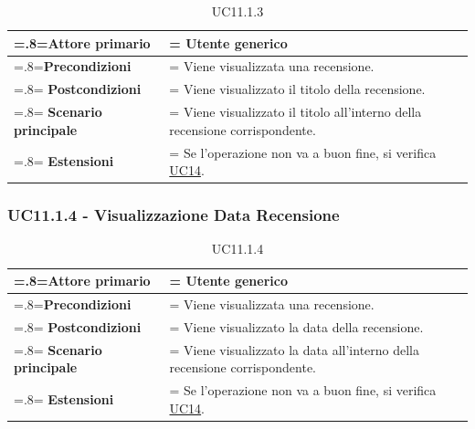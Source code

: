             \begin{table}[H]
                \centering
                \renewcommand{\arraystretch}{1.8}
                \renewcommand\tabularxcolumn[1]{m{#1}}
                \begin{tabularx}{0.9\textwidth} {
                    >{\hsize=.8\hsize\linewidth=\hsize}X
                    >{\hsize=1.2\hsize\linewidth=\hsize}X}
                    \hline
                    \textbf{Attore primario} & Utente generico \\
                    \hline
                    \textbf{Precondizioni} & Viene visualizzata una recensione. \\
                    \hline
                    \textbf{Postcondizioni} & Viene visualizzato il titolo della recensione. \\
                    \hline
                    \textbf{Scenario principale} & Viene visualizzato il titolo all'interno della recensione corrispondente. \\
                    \hline
                    \textbf{Estensioni} & Se l'operazione non va a buon fine, si verifica \hyperref[UC14]{UC14}. \\
                    \hline
                \end{tabularx}
                \caption{UC11.1.3}
            \end{table}

        \subsubsection{UC11.1.4 - Visualizzazione Data Recensione}
        \label{UC11.1.4}

            \begin{table}[H]
                \centering
                \renewcommand{\arraystretch}{1.8}
                \renewcommand\tabularxcolumn[1]{m{#1}}
                \begin{tabularx}{0.9\textwidth} {
                    >{\hsize=.8\hsize\linewidth=\hsize}X
                    >{\hsize=1.2\hsize\linewidth=\hsize}X}
                    \hline
                    \textbf{Attore primario} & Utente generico \\
                    \hline
                    \textbf{Precondizioni} & Viene visualizzata una recensione. \\
                    \hline
                    \textbf{Postcondizioni} & Viene visualizzato la data della recensione. \\
                    \hline
                    \textbf{Scenario principale} & Viene visualizzato la data all'interno della recensione corrispondente. \\
                    \hline
                    \textbf{Estensioni} & Se l'operazione non va a buon fine, si verifica \hyperref[UC14]{UC14}. \\
                    \hline
                \end{tabularx}
                \caption{UC11.1.4}
            \end{table}

